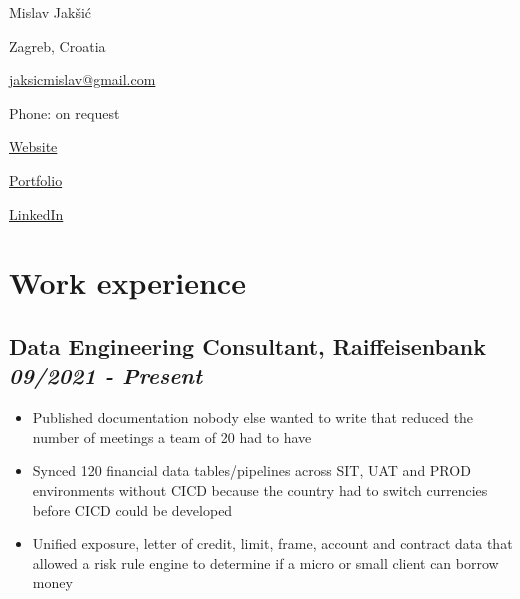 \documentclass[a4paper]{article}
\newcommand{\bolditalicpair}
[2]
{\textbf{#1} \texorpdfstring{\hfill}{} \textit{#2}}
\begin{document}
\pagecolor{BackgroundColor}

\begin{multicols}{3}

\noindent
\begin{minipage}{.22\textwidth}
\raggedright

{\huge Mislav Jakšić}

Zagreb, Croatia
\end{minipage}

\noindent
\begin{minipage}{.50\textwidth}
\raggedleft

\href{mailto:jaksicmislav@gmail.com}{jaksicmislav@gmail.com}

Phone: on request

\end{minipage}

\noindent
\begin{minipage}{.32\textwidth}
\raggedleft

\href{https://mislav-jaksic.from.hr/}{Website}

\href{https://github.com/MislavJaksic}{Portfolio}

\href{https://www.linkedin.com/in/mislav-jaksic}{LinkedIn}

\end{minipage}

\end{multicols}



\section{Work experience}

\subsection{\bolditalicpair{Data Engineering Consultant, Raiffeisenbank}{09/2021 - Present}}

\begin{itemize}
 \item Published documentation nobody else wanted to write that reduced the number of meetings a team of 20 had to have
 \item Synced 120 financial data tables/pipelines across SIT, UAT and PROD environments without CICD because the country had to switch currencies before CICD could be developed
 \item Unified exposure, letter of credit, limit, frame, account and contract data that allowed a risk rule engine to determine if a micro or small client can borrow money
\end{itemize}
\end{document}
